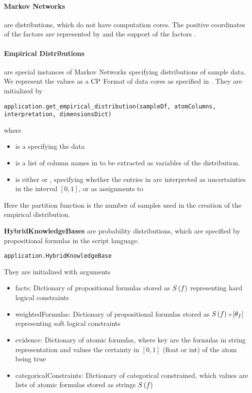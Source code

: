 \paragraph{Markov Networks} are distributions, which do not have computation cores.
The positive coordinates of the factors are represented by  and the support of the factors .

\paragraph{Empirical Distributions} are special instances of Markov Networks specifying distributions of sample data.
We represent the values as a $\mathrm{CP}$ Format of data cores as specified in .
They are initialized by
\begin{lstlisting}
application.get_empirical_distribution(sampleDf, atomColumns, interpretation, dimensionsDict)
\end{lstlisting}
where
\begin{itemize}
    \item {} is a  specifying the data
    \item {} is a list of column names in  to be extracted as variables of the distribution.
    \item {} is either  or , specifying whether the entries in  are interpreted as uncertainties in the interval $[0,1]$, or as assignments to
\end{itemize}

Here the partition function is the number of samples used in the creation of the empirical distribution.


\textbf{HybridKnowledgeBases} are probability distributions, which are specified by propositional formulas in the script language.
\begin{lstlisting}
application.HybridKnowledgeBase
\end{lstlisting}
They are initialized with arguments
\begin{itemize}
    \item facts: Dictionary of propositional formulas stored as $S\left(f\right)$ representing hard logical constraints
    \item weightedFormulas: Dictionary of propositional formulas stored as $S\left(f\right)$+$[\theta_{f}]$ representing soft logical constraints
    \item evidence: Dictionary of atomic formulas, where key are the formulas in string representation and values the certainty in $[0,1]$ (float or int) of the atom being true
    \item categoricalConstraints: Dictionary of categorical constrained, which values are lists of atomic formulas stored as strings $S\left(f\right)$
\end{itemize}


